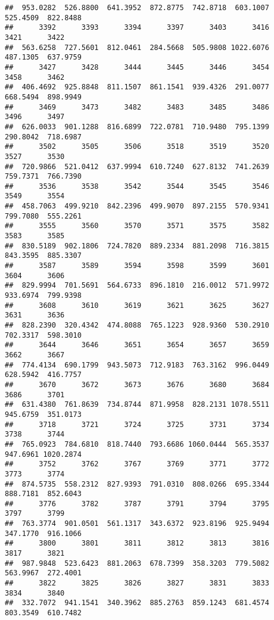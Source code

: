 \documentclass[
]{article}
\begin{document}
\begin{verbatim}
##  953.0282  526.8800  641.3952  872.8775  742.8718  603.1007  525.4509  822.8488 
##      3392      3393      3394      3397      3403      3416      3421      3422 
##  563.6258  727.5601  812.0461  284.5668  505.9808 1022.6076  487.1305  637.9759 
##      3427      3428      3444      3445      3446      3454      3458      3462 
##  406.4692  925.8848  811.1507  861.1541  939.4326  291.0077  668.5494  898.9949 
##      3469      3473      3482      3483      3485      3486      3496      3497 
##  626.0033  901.1288  816.6899  722.0781  710.9480  795.1399  290.8042  718.6987 
##      3502      3505      3506      3518      3519      3520      3527      3530 
##  720.9866  521.0412  637.9994  610.7240  627.8132  741.2639  759.7371  766.7390 
##      3536      3538      3542      3544      3545      3546      3549      3554 
##  458.7063  499.9210  842.2396  499.9070  897.2155  570.9341  799.7080  555.2261 
##      3555      3560      3570      3571      3575      3582      3583      3585 
##  830.5189  902.1806  724.7820  889.2334  881.2098  716.3815  843.3595  885.3307 
##      3587      3589      3594      3598      3599      3601      3604      3606 
##  829.9994  701.5691  564.6733  896.1810  216.0012  571.9972  933.6974  799.9398 
##      3608      3610      3619      3621      3625      3627      3631      3636 
##  828.2390  320.4342  474.8088  765.1223  928.9360  530.2910  702.3317  598.3010 
##      3644      3646      3651      3654      3657      3659      3662      3667 
##  774.4134  690.1799  943.5073  712.9183  763.3162  996.0449  628.5942  416.7757 
##      3670      3672      3673      3676      3680      3684      3686      3701 
##  631.4380  761.8639  734.8744  871.9958  828.2131 1078.5511  945.6759  351.0173 
##      3718      3721      3724      3725      3731      3734      3738      3744 
##  765.0923  784.6810  818.7440  793.6686 1060.0444  565.3537  947.6961 1020.2874 
##      3752      3762      3767      3769      3771      3772      3773      3774 
##  874.5735  558.2312  827.9393  791.0310  808.0266  695.3344  888.7181  852.6043 
##      3776      3782      3787      3791      3794      3795      3797      3799 
##  763.3774  901.0501  561.1317  343.6372  923.8196  925.9494  347.1770  916.1066 
##      3800      3801      3811      3812      3813      3816      3817      3821 
##  987.9848  523.6423  881.2063  678.7399  358.3203  779.5082  563.9967  272.4001 
##      3822      3825      3826      3827      3831      3833      3834      3840 
##  332.7072  941.1541  340.3962  885.2763  859.1243  681.4574  803.3549  610.7482 

\end{verbatim}
\end{document}
